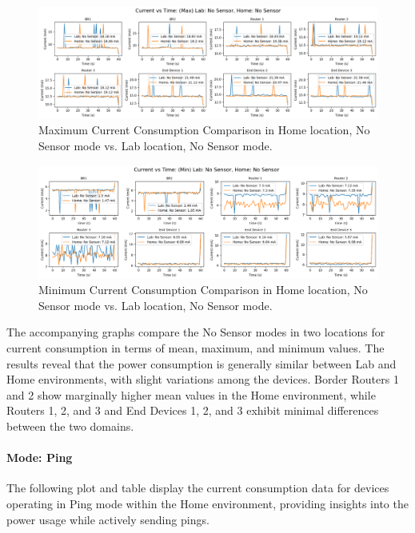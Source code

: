 \begin{figure}[H]
  \includegraphics[width=1\textwidth]{images/research_results/current_consumption_analysis/maximum/home/no_sensor/comparison/lab_no-sensor_vs_home_no-sensor/max_comparison_lab_vs_home.png}
  \caption{Maximum Current Consumption Comparison in Home location, No Sensor mode vs. Lab location, No Sensor mode.}
  \label{fig:max_comparison_lab_vs_home_no-sensor}
\end{figure}

\begin{figure}[H]
  \centering
    \includegraphics[width=1\textwidth]{images/research_results/current_consumption_analysis/maximum/home/no_sensor/comparison/lab_no-sensor_vs_home_no-sensor/min_comparison_lab_vs_home.png}
    \caption{Minimum Current Consumption Comparison in Home location, No Sensor mode vs. Lab location, No Sensor mode.}
    \label{fig:min_comparison_lab_vs_home_no-sensor}
\end{figure}

The accompanying graphs compare the No Sensor modes in two locations for current consumption in terms of mean, maximum, and minimum values. The results reveal that the power consumption is generally similar between Lab and Home environments, with slight variations among the devices. Border Routers 1 and 2 show marginally higher mean values in the Home environment, while Routers 1, 2, and 3 and End Devices 1, 2, and 3 exhibit minimal differences between the two domains.

\paragraph{Mode: Ping}
The following plot and table display the current consumption data for devices operating in Ping mode within the Home environment, providing insights into the power usage while actively sending pings.

